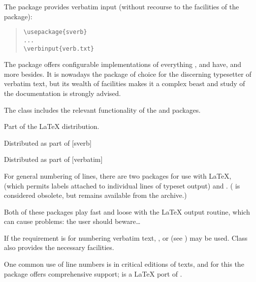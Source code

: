 The  package provides verbatim input (without recourse
to the facilities of the  package):
\begin{quote}
\begin{verbatim}
\usepackage{sverb}
...
\verbinput{verb.txt}
\end{verbatim}
\end{quote}

The  package offers configurable implementations of
everything ,  and 
have, and more besides.  It is nowadays the package of choice for the
discerning typesetter of verbatim text, but its wealth of facilities
makes it a complex beast and study of the documentation is strongly
advised.

The  class includes the relevant functionality of the
 and  packages.
\begin{ctanrefs}
\item[alltt.sty]Part of the \LaTeX{} distribution.
\item[fancyvrb.sty]
\item[memoir.cls]
\item[moreverb.sty]
\item[sverb.sty]Distributed as part of [sverb]
\item[verbatim.sty]Distributed as part of [verbatim]
\end{ctanrefs}


For general numbering of lines, there are two packages for use with
\LaTeX{},  (which permits labels attached to
individual lines of typeset output) and .
( is considered obsolete, but remains available from
the archive.)

Both of these packages play fast and loose with the \LaTeX{} output
routine, which can cause problems: the user should beware\dots{}

If the requirement is for numbering verbatim text, ,
or  (see %
) may be used.
Class  also provides the necessary facilities.

One common use of line numbers is in critical editions of texts, and
for this the  package offers comprehensive support;
 is a \LaTeX{} port of .

